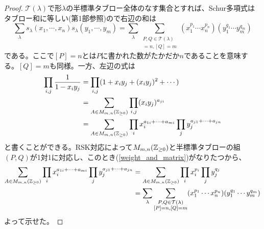 \documentclass{ltjsreport}
\begin{document}
\begin{proof}
  $\mathcal{T}(\lambda)$で形$\lambda$の半標準タブロー全体のなす集合とすれば、Schur多項式はタブロー和に等しい(第1部参照)ので右辺の和は
  \[
  \sum_{\lambda}s_\lambda(x_1,\cdots,x_n)s_\lambda(y_1,\cdots,y_m)
  =\sum_{\lambda}
  \sum_{\substack{P,Q\in\mathcal{T}(\lambda) \\ [P]=n,[Q]=m}}
  (x_1^{p_1}\cdots x_n^{p_n})(y_1^{q_1}\cdots y_m^{q_m})
  \]
  である。ここで$[P]=n$とは$P$に書かれた数がたかだか$n$であることを意味する。$[Q]=m$も同様。一方、左辺の式は
  \begin{align*}
  \prod_{i,j}\frac{1}{1-x_iy_j}&=\prod_{i,j}(1+x_iy_j+(x_iy_j)^2+\cdots)\\
  &=\sum_{A\in M_{m,n}(\mathbb{Z}_{\geq 0})}\prod_{i,j}(x_iy_j)^{a_{ji}}\\
  &=\sum_{A\in M_{m,n}(\mathbb{Z}_{\geq 0})}\prod_i x_i^{a_{1i}+\cdots+a_{mi}}\prod_j y_j^{a_{j1}+\cdots+a_{jn}}
  \end{align*}
  と書くことができる。RSK対応によって$M_{m,n}(\mathbb{Z}_{\geq 0})$と半標準タブローの組$(P,Q)$が1対1に対応し、このとき(\ref{weight_and_matrix})がなりたつから、
  \begin{align*}
    \sum_{A\in M_{m,n}(\mathbb{Z}_{\geq 0})}\prod_i x_i^{a_{1i}+\cdots+a_{mi}}\prod_j y_j^{a_{j1}+\cdots+a_{jn}}
    &=\sum_{A\in M_{m,n}(\mathbb{Z}_{\geq 0})}\prod_i x_i^{p_i}\prod_j y_j^{q_j}\\
    &=\sum_{\lambda}
    \sum_{\substack{P,Q\in\mathcal{T}(\lambda) \\ [P]=n,[Q]=m}}
    (x_1^{p_1}\cdots x_n^{p_n})(y_1^{q_1}\cdots y_m^{q_m})
  \end{align*}
  よって示せた。
\end{proof}
\end{document}
